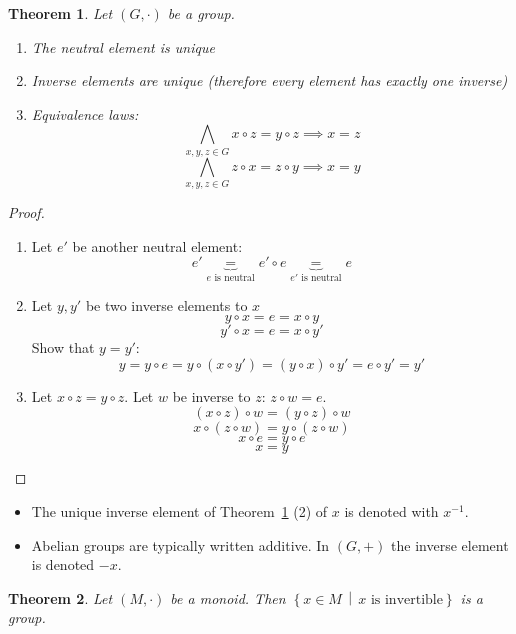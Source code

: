 \documentclass[a4paper,landscape,twocolumn]{article}
\newcommand\setdef[2]{\left\{#1\,\middle|\,#2\right\}}
\newtheorem{theorem}{Theorem}
\begin{document}
\begin{theorem}
  \label{satz-2-10}
  Let $(G, \cdot)$ be a group.
  \begin{enumerate}
    \item The neutral element is unique
    \item Inverse elements are unique (therefore every element has exactly one inverse)
    \item Equivalence laws:
      \[ \bigwedge_{x,y,z \in G} x \circ z = y \circ z \implies x = z \]
      \[ \bigwedge_{x,y,z \in G} z \circ x = z \circ y \implies x = y \]
  \end{enumerate}
\end{theorem}

\begin{proof}
  \begin{enumerate}
    \item Let $e'$ be another neutral element:
      \[ e' \underbrace{=}_{e \text{ is neutral}} e' \circ e \underbrace{=}_{e' \text{ is neutral}} e \]
    \item Let $y, y'$ be two inverse elements to $x$
      \[ y \circ x = e = x \circ y \]
      \[ y' \circ x = e = x \circ y' \]
      Show that $y = y'$:
      \[ y = y \circ e = y \circ (x \circ y') = (y \circ x) \circ y' = e \circ y' = y' \]
    \item Let $x \circ z = y \circ z$. Let $w$ be inverse to $z$: $z \circ w = e$.
      \[ (x \circ z) \circ w = (y \circ z) \circ w \]
      \[ x \circ (z \circ w) = y \circ (z \circ w) \]
      \[ x \circ e = y \circ e \]
      \[ x = y \]
  \end{enumerate}
\end{proof}

\begin{itemize}
  \item The unique inverse element of Theorem~\ref{satz-2-10} (2) of $x$ is denoted with $x^{-1}$.
  \item
    Abelian groups are typically written additive.
    In $(G, +)$ the inverse element is denoted $-x$.
\end{itemize}

\begin{theorem}
  \label{satz-2-12}
  Let $(M, \cdot)$ be a monoid. Then $\setdef{x \in M}{x \text{ is invertible}}$ is a group.
\end{theorem}
\end{document}
